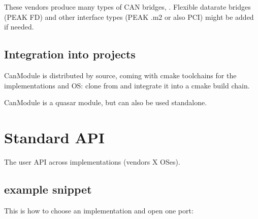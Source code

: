\documentclass[a4paper,10pt,english]{sphinxmanual}
\begin{document}
\sphinxAtStartPar
These vendors produce many types of CAN bridges, . Flexible datarate bridges (PEAK FD) and other interface types
(PEAK .m2 or also PCI) might be added if needed.


\section{Integration into projects}
\label{\detokenize{objective:integration-into-projects}}
\sphinxAtStartPar
CanModule is distributed by source, coming with cmake toolchains for the implementations and OS:
clone from  and integrate it into a cmake build chain.

\sphinxAtStartPar
CanModule is a quasar module, but can also be used stand\sphinxhyphen{}alone.


\chapter{Standard API}
\label{\detokenize{standardApi:standard-api}}\label{\detokenize{standardApi::doc}}
\sphinxAtStartPar
The user API  across implementations (vendors X OSes).


\section{example snippet}
\label{\detokenize{standardApi:example-snippet}}
\sphinxAtStartPar
This is how to choose an implementation and open one port:
\end{document}
